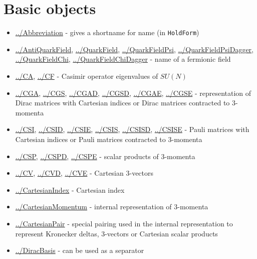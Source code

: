 \documentclass[../FeynCalcManual.tex]{subfiles}
\begin{document}
\hypertarget{basic objects}{
\section{Basic objects}\label{basic objects}}

\begin{itemize}
\tightlist
\item
  \hyperlink{../abbreviation}{../Abbreviation} - gives a shortname for
  name (in \texttt{HoldForm})
\item
  \hyperlink{../antiquarkfield}{../AntiQuarkField},
  \hyperlink{../quarkfield}{../QuarkField},
  \hyperlink{../quarkfieldpsi}{../QuarkFieldPsi},
  \hyperlink{../quarkfieldpsidagger}{../QuarkFieldPsiDagger},
  \hyperlink{../quarkfieldchi}{../QuarkFieldChi},
  \hyperlink{../quarkfieldchidagger}{../QuarkFieldChiDagger} - name of a
  fermionic field
\item
  \hyperlink{../ca}{../CA}, \hyperlink{../cf}{../CF} - Casimir operator
  eigenvalues of \(SU(N)\)
\item
  \hyperlink{../cga}{../CGA}, \hyperlink{../cgs}{../CGS},
  \hyperlink{../cgad}{../CGAD}, \hyperlink{../cgsd}{../CGSD},
  \hyperlink{../cgae}{../CGAE}, \hyperlink{../cgse}{../CGSE} -
  representation of Dirac matrices with Cartesian indices or Dirac
  matrices contracted to \(3\)-momenta
\item
  \hyperlink{../csi}{../CSI}, \hyperlink{../csid}{../CSID},
  \hyperlink{../csie}{../CSIE}, \hyperlink{../csis}{../CSIS},
  \hyperlink{../csisd}{../CSISD}, \hyperlink{../csise}{../CSISE} - Pauli
  matrices with Cartesian indices or Pauli matrices contracted to
  \(3\)-momenta
\item
  \hyperlink{../csp}{../CSP}, \hyperlink{../cspd}{../CSPD},
  \hyperlink{../cspe}{../CSPE} - scalar products of \(3\)-momenta
\item
  \hyperlink{../cv}{../CV}, \hyperlink{../cvd}{../CVD},
  \hyperlink{../cve}{../CVE} - Cartesian \(3\)-vectors
\item
  \hyperlink{../cartesianindex}{../CartesianIndex} - Cartesian index
\item
  \hyperlink{../cartesianmomentum}{../CartesianMomentum} - internal
  representation of \(3\)-momenta
\item
  \hyperlink{../cartesianpair}{../CartesianPair} - special pairing used
  in the internal representation to represent Kronecker deltas,
  \(3\)-vectors or Cartesian scalar products
\item
  \hyperlink{../diracbasis}{../DiracBasis} - can be used as a separator

\end{itemize}
\end{document}
